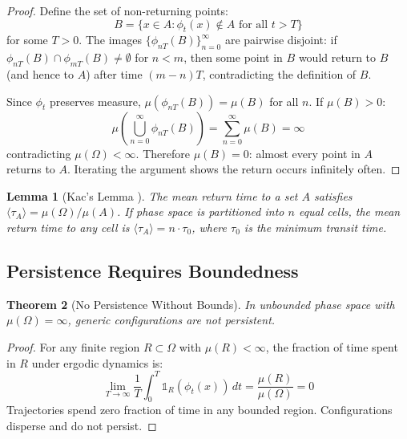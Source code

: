 \documentclass[11pt,twocolumn,a4paper]{article}
\newtheorem{theorem}{Theorem}[section]
\newtheorem{lemma}[theorem]{Lemma}
\theoremstyle{definition}
\theoremstyle{remark}
\begin{document}
\begin{proof}
Define the set of non-returning points:
\begin{equation}
B = \{x \in A : \phi_t(x) \notin A \text{ for all } t > T\}
\end{equation}
for some $T > 0$. The images $\{\phi_{nT}(B)\}_{n=0}^\infty$ are pairwise disjoint: if $\phi_{nT}(B) \cap \phi_{mT}(B) \neq \emptyset$ for $n < m$, then some point in $B$ would return to $B$ (and hence to $A$) after time $(m-n)T$, contradicting the definition of $B$.

Since $\phi_t$ preserves measure, $\mu(\phi_{nT}(B)) = \mu(B)$ for all $n$. If $\mu(B) > 0$:
\begin{equation}
\mu\left(\bigcup_{n=0}^\infty \phi_{nT}(B)\right) = \sum_{n=0}^\infty \mu(B) = \infty
\end{equation}
contradicting $\mu(\Omega) < \infty$. Therefore $\mu(B) = 0$: almost every point in $A$ returns to $A$. Iterating the argument shows the return occurs infinitely often.
\end{proof}

\begin{lemma}[Kac's Lemma \citep{kac1947}]
\label{lem:kac}
The mean return time to a set $A$ satisfies $\langle \tau_A \rangle = \mu(\Omega)/\mu(A)$. If phase space is partitioned into $n$ equal cells, the mean return time to any cell is $\langle \tau_A \rangle = n \cdot \tau_0$, where $\tau_0$ is the minimum transit time.
\end{lemma}

\subsection{Persistence Requires Boundedness}

\begin{theorem}[No Persistence Without Bounds]
\label{thm:no_persistence}
In unbounded phase space with $\mu(\Omega) = \infty$, generic configurations are not persistent.
\end{theorem}

\begin{proof}
For any finite region $R \subset \Omega$ with $\mu(R) < \infty$, the fraction of time spent in $R$ under ergodic dynamics is:
\begin{equation}
\lim_{T \to \infty} \frac{1}{T} \int_0^T \mathbb{1}_R(\phi_t(x)) \, dt = \frac{\mu(R)}{\mu(\Omega)} = 0
\end{equation}
Trajectories spend zero fraction of time in any bounded region. Configurations disperse and do not persist.
\end{proof}
\end{document}
